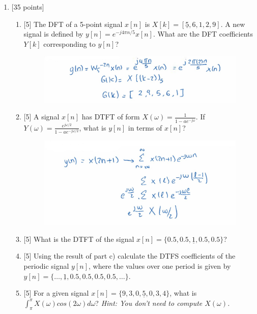 \documentclass{article}
\begin{document}
\begin{enumerate}
    \item  {[35 points]}
    \begin{enumerate}
        \item {[5]} The DFT of a 5-point signal $x[n]$ is $X[k] = [\underline{5},6,1,2,9]$. A new signal is defined by $y[n]=e^{-j4\pi n/5}x[n]$. What are the DFT coefficients $Y[k]$ corresponding to $y[n]$? 
        \begin{figure}[H]
            \centering
            \includegraphics[width=.7\textwidth]{mt2_q1_a.png}
        \end{figure}
        \item {[5]} A signal $x[n]$ has DTFT of form $X(\omega) = \frac{1}{1-ae^{-j\omega}}$. If $Y(\omega) = \frac{e^{j\omega/2}}{1-ae^{-j\omega/2}}$, what is $y[n]$ in terms of $x[n]$?
        \begin{figure}[H]
            \centering
            \includegraphics[width=.7\textwidth]{mt2_q1_b.png}
        \end{figure}
        \item {[5]} What is the DTFT of the signal $x[n] = \{0.5,0.5,\underline{1},0.5,0.5\}$? 
        \vspace{1in}
        \item {[5]} Using the result of part c) calculate the DTFS coefficients of the periodic signal $y[n]$, where the values over one period is given by $y[n] = \{\dots,\underline{1},0.5,0.5,0.5,0.5,\dots\}$.
        \vspace{2in}
        \item {[5]} For a given signal $x[n] = \{9,3,0,\underline{5},0,3,4\}$, what is $\int_{\pi}^\pi X(\omega) cos(2\omega) d\omega$? {\it Hint: You don't need to compute $X(\omega)$.}

\end{enumerate}
\end{enumerate}
\end{document}
